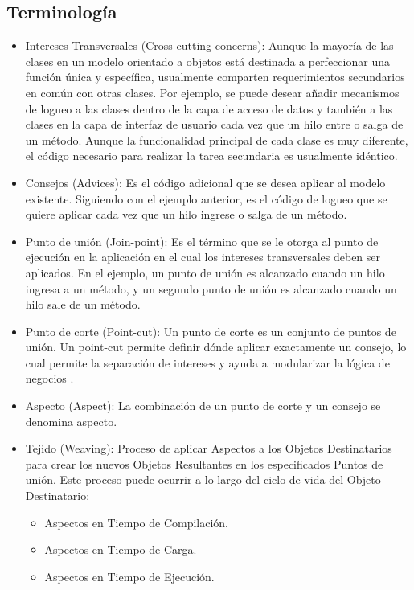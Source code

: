 \subsection{Terminología}
\label{sec:aop_terminologia}
\begin{itemize}
  \item Intereses Transversales (Cross-cutting concerns): Aunque la mayoría de
  las clases en un modelo orientado a objetos está destinada a perfeccionar una función única y
  específica, usualmente comparten requerimientos secundarios en común con otras
  clases. Por ejemplo, se puede desear añadir mecanismos de logueo a las clases
  dentro de la capa de acceso de datos y también a las clases en la capa de
  interfaz de usuario cada vez que un hilo entre o salga de un método. Aunque la
  funcionalidad principal de cada clase es muy diferente, el código necesario
  para realizar la tarea secundaria es usualmente
  idéntico.\cite{Introduction_To_Aspect}
  
  \item Consejos (Advices): Es el código adicional que se desea aplicar al
  modelo existente. Siguiendo con el ejemplo anterior, es el código de logueo
  que se quiere aplicar cada vez que un hilo ingrese o salga de un
  método.\cite{Introduction_To_Aspect}
  
  \item Punto de unión (Join-point): Es el término que se le otorga al punto
  de ejecución en la aplicación en el cual los intereses transversales deben ser
  aplicados. En el ejemplo, un punto de unión es alcanzado cuando un hilo
  ingresa a un método, y un segundo punto de unión es alcanzado cuando un hilo
  sale de un método.
  
  \item Punto de corte (Point-cut): Un punto de corte es un conjunto de puntos
  de unión. Un point-cut permite definir dónde aplicar exactamente un consejo,
  lo cual permite la separación de intereses y ayuda a modularizar la lógica de
  negocios \cite{Classification_Of_Pointcut_Language_Constructs}.
  
  \item Aspecto (Aspect): La combinación de un punto de corte y un consejo se
  denomina aspecto. \cite{Introduction_To_Aspect}
  
  \item Tejido (Weaving): Proceso de aplicar Aspectos a los Objetos
  Destinatarios para crear los nuevos Objetos Resultantes en los especificados
  Puntos de unión. Este proceso puede ocurrir a lo largo del ciclo de vida del
  Objeto Destinatario:
  	\begin{itemize}
		\item Aspectos en Tiempo de Compilación.
		\item Aspectos en Tiempo de Carga.
		\item Aspectos en Tiempo de Ejecución.
	\end{itemize}
\end{itemize} 